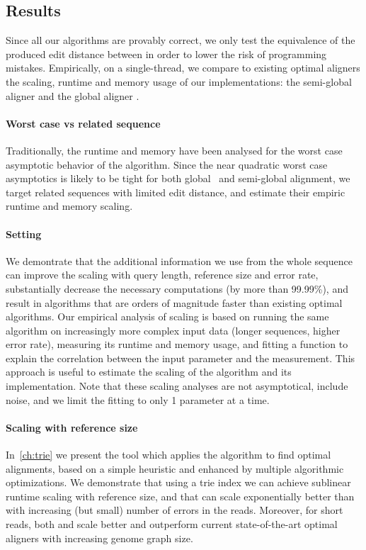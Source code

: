 \subsection*{Results}

Since all our algorithms are provably correct, we only test the equivalence of
the produced edit distance between in order to lower the risk of programming
mistakes. Empirically, on a single-thread, we compare to existing optimal
aligners the scaling, runtime and memory usage of our implementations: the
semi-global aligner \astarix and the global aligner \astarpa.

\paragraph{Worst case vs related sequence}
Traditionally, the runtime and memory have been analysed for the worst case
asymptotic behavior of the algorithm. Since the near quadratic worst case
asymptotics is likely to be tight for both global~\citep{backurs2015edit} and
semi-global alignment, we target related sequences with limited edit distance,
and estimate their empiric runtime and memory scaling.

\paragraph{Setting}
We demontrate that the additional information we use from the whole sequence can
improve the scaling with query length, reference size and error rate,
substantially decrease the necessary computations (by more than 99.99\%), and
result in algorithms that are orders of magnitude faster than existing optimal
algorithms. Our empirical analysis of scaling is based on running the same
algorithm on increasingly more complex input data (longer sequences, higher
error rate), measuring its runtime and memory usage, and fitting a function to
explain the correlation between the input parameter and the measurement. This
approach is useful to estimate the scaling of the algorithm and its
implementation. Note that these scaling analyses are not asymptotical, include
noise, and we limit the fitting to only 1 parameter at a time.

\paragraph{Scaling with reference size}
In~\cref{ch:trie} we present the tool \astarix which applies the \A algorithm to
find optimal alignments, based on a simple heuristic and enhanced by multiple
algorithmic optimizations. We demonstrate that using a trie index we can achieve
sublinear runtime scaling with reference size, and that \A can scale
exponentially better than \dijkstra with increasing (but small) number of errors
in the reads. Moreover, for short reads, both \astarix and \dijkstra scale
better and outperform current state-of-the-art optimal aligners with increasing
genome graph size.


